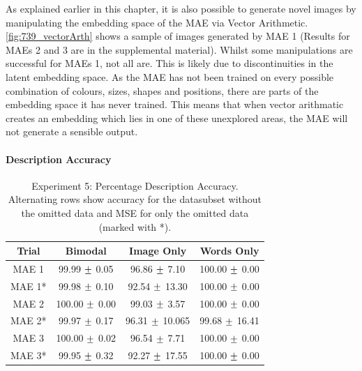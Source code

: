 As explained earlier in this chapter, it is also possible to generate novel images by manipulating the embedding space of the \ac{MAE} via Vector Arithmetic. \autoref{fig:739_vectorArth} shows a sample of images generated by \ac{MAE} 1 (Results for \acp{MAE} 2 and 3 are in the supplemental material). Whilst some manipulations are successful for \acp{MAE} 1, not all are. This is likely due to discontinuities in the latent embedding space. As the \ac{MAE} has not been trained on every possible combination of colours, sizes, shapes and positions, there are parts of the embedding space it has never trained. This means that when vector arithmatic creates an embedding which lies in one of these unexplored areas, the \ac{MAE} will not generate a sensible output. 


\paragraph{Description Accuracy}
\begin{table}[h!]
\centering
	\begin{tabular}{|c|c|c|c|}
	\hline
\textbf{Trial}	 & 	\textbf{Bimodal} & \textbf{Image Only} 	& 	\textbf{Words Only} \\ \hline
MAE 1	&	99.99	$\mypm$	0.05	&	96.86	$\mypm$	7.10	&	100.00	$\mypm$	0.00	\\ \hline
MAE 1*	&	99.98	$\mypm$	0.10	&	92.54	$\mypm$	13.30	&	100.00	$\mypm$	0.00	\\ \hline
MAE 2	&	100.00	$\mypm$	0.00	&	99.03	$\mypm$	3.57	&	100.00	$\mypm$	0.00	\\ \hline
MAE 2*	&	99.97	$\mypm$	0.17	&	96.31	$\mypm$	10.065	&	99.68	$\mypm$	16.41	\\ \hline
MAE 3	&	100.00	$\mypm$	0.02	&	96.54	$\mypm$	7.71	&	100.00	$\mypm$	0.00	\\ \hline

MAE 3*	&	99.95	$\mypm$	0.32	&	92.27	$\mypm$	17.55	&	100.00	$\mypm$	0.00	\\ \hline

	\end{tabular}
\caption{Experiment 5: Percentage Description Accuracy. Alternating rows show accuracy for the datasubset without the omitted data and MSE for only the omitted data (marked with *).}
\label{tab:res_exp5_acc}
\end{table}


